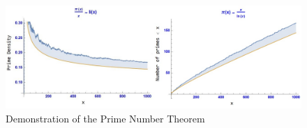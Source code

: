    \begin{figure}[hbt!]
        \centering
        \includegraphics[scale=0.44]{images/fig1.JPG}
        \caption{Demonstration of the Prime Number Theorem}
        \label{fig:1}       %
    \end{figure}

